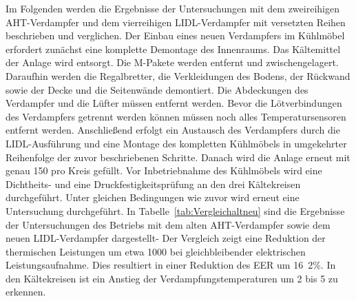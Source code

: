 Im Folgenden werden die Ergebnisse der Untersuchungen mit dem zweireihigen AHT-Verdampfer und dem vierreihigen LIDL-Verdampfer mit versetzten Reihen beschrieben und verglichen. Der Einbau eines neuen Verdampfers im Kühlmöbel erfordert zunächst eine komplette Demontage des Innenraums. Das Kältemittel der Anlage wird entsorgt. Die M-Pakete werden entfernt und zwischengelagert. Daraufhin werden die Regalbretter, die Verkleidungen des Bodens, der Rückwand sowie der Decke und die Seitenwände demontiert. Die Abdeckungen des Verdampfer und die Lüfter müssen entfernt werden. Bevor die Lötverbindungen des Verdampfers getrennt werden können müssen noch alles Temperatursensoren entfernt werden. Anschließend erfolgt ein Austausch des Verdampfers durch die LIDL-Ausführung und eine Montage des kompletten Kühlmöbels in umgekehrter Reihenfolge der zuvor beschriebenen Schritte. Danach wird die Anlage erneut mit genau \unit{150}{\gram} pro Kreis gefüllt. Vor Inbetriebnahme des Kühlmöbels wird eine Dichtheits- und eine Druckfestigkeitsprüfung an den drei Kältekreisen durchgeführt. Unter gleichen Bedingungen wie zuvor wird erneut eine Untersuchung durchgeführt. \newline In Tabelle~\ref{tab:Vergleichaltneu} sind die Ergebnisse der Untersuchungen des Betriebs mit dem alten AHT-Verdampfer sowie dem neuen LIDL-Verdampfer dargestellt-
Der Vergleich zeigt eine Reduktion der thermischen Leistungen um etwa \unit{1000}{\watt} bei gleichbleibender elektrischen Leistungsaufnahme. Dies resultiert in einer Reduktion des EER um \unit{16.2}{\%}. In den Kältekreisen ist ein Anstieg der Verdampfungstemperaturen um \unit{2}{\kelvin} bis \unit{5}{\kelvin} zu erkennen.


